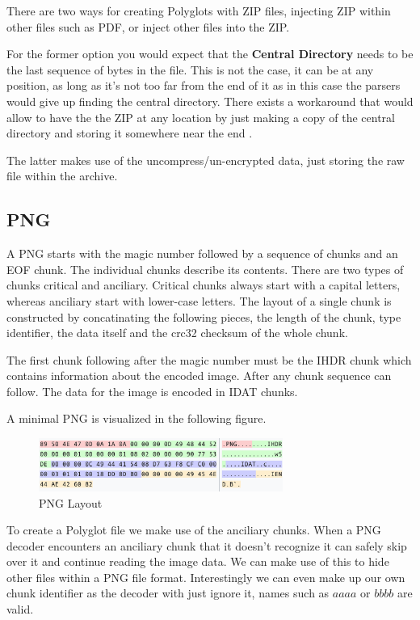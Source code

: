 There are two ways for creating Polyglots with ZIP files, injecting ZIP within other files such as PDF, or inject other files into the ZIP.

For the former option you would expect that the \textbf{Central Directory} needs to be the last sequence of bytes in the file. This is not the case,
it can be at any position, as long as it's not too far from the end of it as in this case the parsers would give up finding the central directory.
There exists a workaround that would allow to have the the ZIP at any location by just making a copy of the central directory and storing it somewhere near the end \cite{Ange3}.

The latter makes use of the uncompress/un-encrypted data, just storing the raw file within the archive.


\subsection{PNG}

A PNG starts with the magic number followed by a sequence of chunks and an EOF chunk.
The individual chunks describe its contents. There are two types of chunks critical and anciliary. Critical chunks always start with a capital letters, whereas anciliary start with lower-case letters.
The layout of a single chunk is constructed by concatinating the following pieces, the length of the chunk, type identifier, the data itself and the crc32 checksum of the whole chunk.

The first chunk following after the magic number must be the IHDR chunk which contains information about the encoded image. After any chunk sequence can follow. The data for the image is encoded in IDAT chunks.

A minimal PNG is visualized in the following figure.

\begin{figure}[h]
    \center
    \includegraphics[width=8cm]{images/png.png}
    \caption{PNG Layout\cite{png}}
\end{figure}

To create a Polyglot file we make use of the anciliary chunks. When a PNG decoder encounters an anciliary chunk that it doesn't
recognize it can safely skip over it and continue reading the image data. We can make use of this to hide other files within a PNG
file format. Interestingly we can even make up our own chunk identifier as the decoder with just ignore it, names such as $aaaa$ or $bbbb$
are valid.



